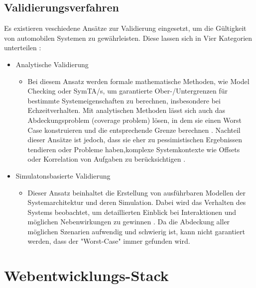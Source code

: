 \subsection{Validierungsverfahren}

Es existieren veschiedene Ansätze zur Validierung eingesetzt, um die Gültigkeit von automobilen Systemen zu gewährleisten. Diese lassen sich in Vier Kategorien unterteilen\cite{kollmann2010comparative} \cite{venkitachalam2015} \cite{weissnegger2016automatic}:

\begin{itemize}
  \item Analytische Validierung
        \begin{itemize}
          \item [] Bei diesem Ansatz werden formale mathematische Methoden, wie Model Checking oder SymTA/s, um garantierte Ober-/Untergrenzen für bestimmte Systemeigenschaften zu berechnen, insbesondere bei Echzeitverhalten. Mit analytischen Methoden lässt sich auch das Abdeckungsproblem (coverage problem) lösen, in dem sie einen Worst Case konstruieren und die entsprechende Grenze berechnen \cite{kollmann2010comparative}. Nachteil dieser Ansätze ist jedoch, dass sie eher zu pessimistischen Ergebnissen tendieren oder Probleme haben,komplexe Systemkontexte wie Offsets oder Korrelation von Aufgaben zu berücksichtigen \cite{kollmann2010comparative}.
        \end{itemize}
  \item Simulatonsbasierte Validierung
        \begin{itemize}
          \item [] Dieser Ansatz beinhaltet die Erstellung von ausführbaren Modellen der Systemarchitektur und deren Simulation. Dabei wird das Verhalten des Systems beobachtet, um detaillierten Einblick bei Interaktionen und möglichen Nebenwirkungen zu gewinnen \cite{bucher2019crosslayera} \cite{kollmann2010comparative}. Da die Abdeckung aller möglichen Szenarien aufwendig und schwierig ist, kann nicht garantiert werden, dass der "Worst-Case" immer gefunden wird.
        \end{itemize}
\end{itemize}

\section{Webentwicklungs-Stack}